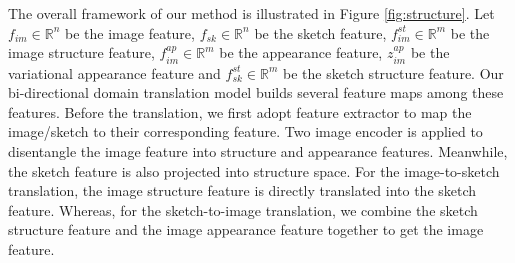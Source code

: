 \documentclass[10pt,twocolumn,letterpaper]{article}
\begin{document}
The overall framework of our method is illustrated in Figure \ref{fig:structure}.
Let $f_{im} \in \mathbb{R}^n$ be the image feature, $f_{sk} \in \mathbb{R}^n$ be the sketch feature, $f^{st}_{im} \in \mathbb{R}^m$ be the image structure feature, $f^{ap}_{im} \in \mathbb{R}^m$ be the appearance feature, $z^{ap}_{im}$ be the variational appearance feature and $f^{st}_{sk} \in \mathbb{R}^m$ be the sketch structure feature. 
Our bi-directional domain translation model builds several feature maps among these features. Before the translation, we first adopt feature extractor to map the image/sketch to their corresponding feature. Two image encoder is applied to disentangle the image feature into structure and appearance features. Meanwhile, the sketch feature is also projected into structure space. For the image-to-sketch translation, the image structure feature is directly translated into the sketch feature. Whereas, for the sketch-to-image translation, we combine the sketch structure feature and the image appearance feature together to get the image feature.
\end{document}
